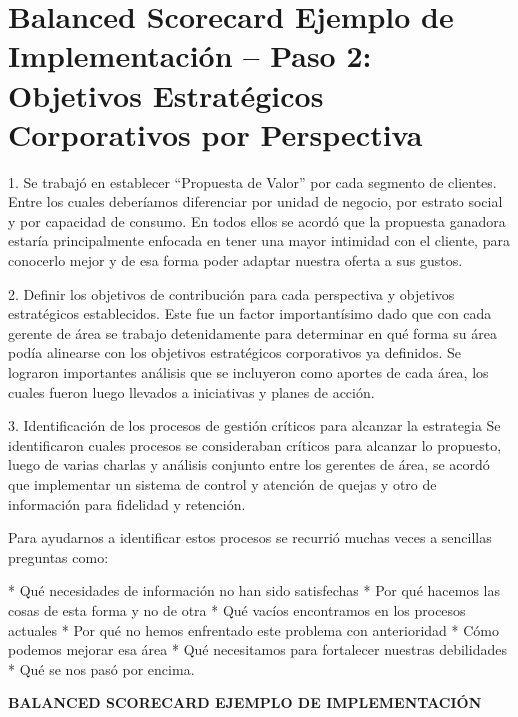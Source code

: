 \section{Balanced Scorecard Ejemplo de Implementación – Paso 2: Objetivos Estratégicos Corporativos por Perspectiva}
\item {1. Se trabajó en establecer “Propuesta de Valor” por cada segmento de clientes. Entre los cuales deberíamos diferenciar por unidad de negocio, por estrato social y por capacidad de consumo. En todos ellos se acordó que la propuesta ganadora estaría principalmente enfocada en tener una mayor intimidad con el cliente, para conocerlo mejor y de esa forma poder adaptar nuestra oferta a sus gustos.

2. Definir los objetivos de contribución para cada perspectiva y objetivos estratégicos establecidos.  Este fue un factor importantísimo dado que con cada gerente de área se trabajo detenidamente para determinar en qué forma su área podía alinearse con los objetivos estratégicos corporativos ya definidos. Se lograron importantes análisis que se incluyeron como aportes de cada área, los cuales fueron luego llevados a iniciativas y planes de acción.

3. Identificación de los procesos de gestión críticos para alcanzar la estrategia
Se identificaron cuales procesos se consideraban críticos para alcanzar lo propuesto, luego de varias charlas y análisis conjunto entre los gerentes de área, se acordó que implementar un sistema de control y atención de quejas y otro de información para fidelidad y retención.

Para ayudarnos a identificar estos procesos se recurrió muchas veces a sencillas preguntas como:

* Qué necesidades de información no han sido satisfechas
* Por qué hacemos las cosas de esta forma y no de otra
* Qué vacíos encontramos en los procesos actuales
* Por qué no hemos enfrentado este problema con anterioridad
* Cómo podemos mejorar esa área
* Qué necesitamos para fortalecer nuestras debilidades
* Qué se nos pasó por encima.}







\begin{center}
\vspace*{0.1in}
\begin{Large}
\textbf{BALANCED SCORECARD EJEMPLO DE IMPLEMENTACIÓN} \\
\end{Large}
\end{center}



